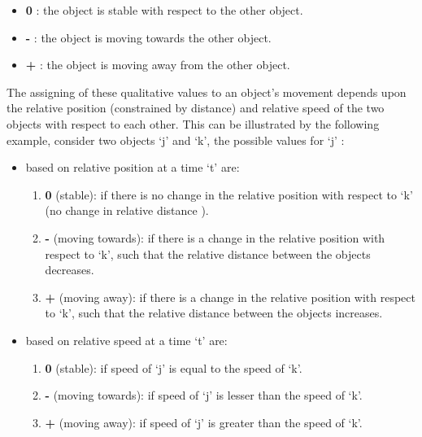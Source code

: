 	\begin{itemize}
		\item \textbf{0} : the object is stable with respect to the other object.
		\item \textbf{-} : the object is moving towards the other object.
		\item \textbf{+} : the object is moving away from the other object.
	\end{itemize}
	The assigning of these qualitative values to an object's movement depends upon the relative position (constrained by distance) and relative speed of the two objects with respect to each other. This can be illustrated by the following example, consider two objects `j' and `k', the possible values for `j' :
	
	\begin{itemize}
		\item based on relative position at a time `t' are:
		\begin{enumerate}
			\item \textbf{0} (stable): if there is no change in the relative position with respect to `k' (no change in relative distance ).
			
			\item \textbf{-} (moving towards): if there is a change in the relative position with respect to `k', such that the relative distance between the objects decreases.
			
			\item \textbf{+} (moving away): if there is a change in the relative position with respect to `k', such that the relative distance between the objects increases.
		\end{enumerate}
		\item based on relative speed at a time `t' are:
		\begin{enumerate}
			\item \textbf{0} (stable): if speed of `j' is equal to the speed of `k'.
			
			\item \textbf{-} (moving towards): if speed of `j' is lesser than the speed of `k'.
			
			\item \textbf{+} (moving away): if speed of `j' is greater than the speed of `k'.
		\end{enumerate}
	\end{itemize}

